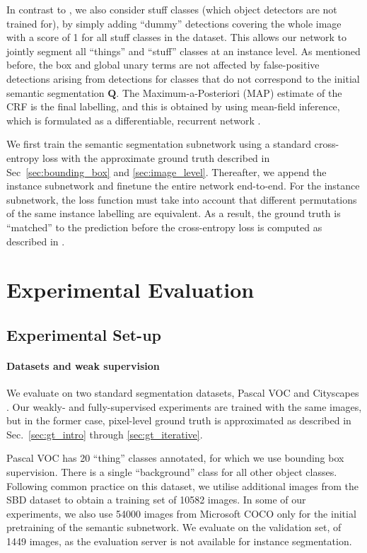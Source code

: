 \documentclass[runningheads]{llncs}
\begin{document}
In contrast to \cite{arnab_cvpr_2017}, we also consider stuff classes (which object detectors are not trained for), by simply adding ``dummy'' detections covering the whole image with a score of 1 for all stuff classes in the dataset.
This allows our network to jointly segment all ``things'' and ``stuff'' classes at an instance level.
As mentioned before, the box and global unary terms are not affected by false-positive detections arising from detections for classes that do not correspond to the initial semantic segmentation $\mathbf{Q}$.
The Maximum-a-Posteriori (MAP) estimate of the CRF is the final labelling, and this is obtained by using mean-field inference, which is formulated as a differentiable, recurrent network \cite{zheng_2015,arnab_ieeespm_2018}.

We first train the semantic segmentation subnetwork using a standard cross-entropy loss with the approximate ground truth described in Sec~\ref{sec:bounding_box} and \ref{sec:image_level}.
Thereafter, we append the instance subnetwork and finetune the entire network end-to-end.
For the instance subnetwork, the loss function must take into account that different permutations of the same instance labelling are equivalent.
As a result, the ground truth is ``matched'' to the prediction before the cross-entropy loss is computed as described in \cite{arnab_cvpr_2017}. \section{Experimental Evaluation}

\subsection{Experimental Set-up}
\paragraph{Datasets and weak supervision}
We evaluate on two standard segmentation datasets, Pascal VOC \cite{everingham_2010} and Cityscapes \cite{cordts_cvpr_2016}.
Our weakly- and fully-supervised experiments are trained with the same images, but in the former case, pixel-level ground truth is approximated as described in Sec.~\ref{sec:gt_intro} through \ref{sec:gt_iterative}.

Pascal VOC has 20 ``thing'' classes annotated, for which we use bounding box supervision. There is a single ``background'' class for all other object classes.
Following common practice on this dataset, we utilise additional images from the SBD dataset \cite{hariharan_2011} to obtain a training set of 10582 images.
In some of our experiments, we also use 54000 images from Microsoft COCO \cite{lin_2014} only for the initial pretraining of the semantic subnetwork.
We evaluate on the validation set, of 1449 images, as the evaluation server is not available for instance segmentation.
\end{document}

